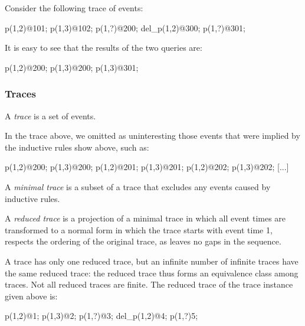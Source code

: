 Consider the following trace of events:

\begin{Dedalus}
p(1,2)@101;
p(1,3)@102;
p(1,?)@200;
del_p(1,2)@300;
p(1,?)@301;
\end{Dedalus}

It is easy to see that the results of the two queries are:


\begin{Dedalus}
p(1,2)@200;
p(1,3)@200;
p(1,3)@301;
\end{Dedalus}


\subsubsection{Traces}

\begin{definition}
A \emph{trace} is a set of events.
\end{definition}

In the trace above, we omitted as uninteresting those events that were implied by the 
inductive rules show above, such as:

\begin{Dedalus}
p(1,2)@200;
p(1,3)@200;
p(1,2)@201;
p(1,3)@201;
p(1,2)@202;
p(1,3)@202;
[...]
\end{Dedalus}



\begin{definition}
A \emph{minimal trace} is a subset of a trace that excludes any events caused by inductive rules.
\end{definition}

\begin{definition}
A \emph{reduced trace} is a projection of a minimal trace in which all event times are transformed
to a normal form in which the trace starts with event time 1, respects the ordering of the original trace, as leaves no gaps in the sequence.
\end{definition}

A trace has only one reduced trace, but an infinite number of infinite traces have the same reduced trace: the reduced trace thus forms an 
equivalence class among traces.  Not all reduced traces are finite.  The reduced trace of the trace instance given above is:

\begin{Dedalus}
p(1,2)@1;
p(1,3)@2;
p(1,?)@3;
del_p(1,2)@4;
p(1,?)5;
\end{Dedalus}

